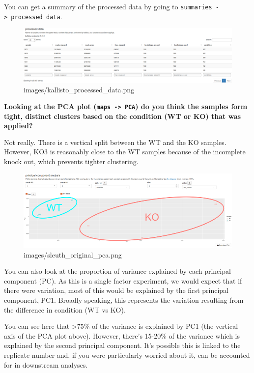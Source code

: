 \documentclass[11pt]{article}
\makeatletter
\def\maxwidth{\ifdim\Gin@nat@width>\linewidth\linewidth
    \else\Gin@nat@width\fi}
\let\Oldincludegraphics\includegraphics
\renewcommand{\includegraphics}[1]{\Oldincludegraphics[width=.8\maxwidth, height=.55\textheight, keepaspectratio]{#1}}
\makeatother
\begin{document}
You can get a summary of the processed data by going to
\texttt{summaries\ -\textgreater{}\ processed\ data}.

    \begin{figure}[!h]
\centering
\includegraphics{images/kallisto_processed_data.png}
\caption{images/kallisto\_processed\_data.png}
\end{figure}

    \textbf{Looking at the PCA plot (\texttt{maps\ -\textgreater{}\ PCA}) do
you think the samples form tight, distinct clusters based on the
condition (WT or KO) that was applied?}

Not really. There is a vertical split between the WT and the KO samples.
However, KO3 is reasonably close to the WT samples because of the
incomplete knock out, which prevents tighter clustering.

    \begin{figure}[!h]
\centering
\includegraphics{images/sleuth_original_pca.png}
\caption{images/sleuth\_original\_pca.png}
\end{figure}

    You can also look at the proportion of variance explained by each
principal component (PC). As this is a single factor experiment, we
would expect that if there were variation, most of this would be
explained by the first principal component, PC1. Broadly speaking, this
represents the variation resulting from the difference in condition (WT
vs KO).

\newpage

You can see here that \textgreater{}75\% of the variance is explained by
PC1 (the vertical axis of the PCA plot above). However, there's 15-20\%
of the variance which is explained by the second principal component.
It's possible this is linked to the replicate number and, if you were
particularly worried about it, can be accounted for in downstream
analyses.
\end{document}
